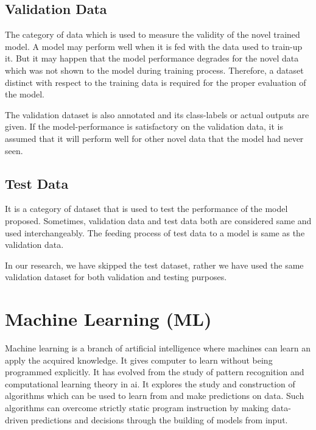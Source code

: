         \subsection{Validation Data}
            The category of data which is used to measure the validity of the novel trained model. A model may perform well when it is fed with the data used to train-up it. But it may happen that the model performance degrades for the novel data which was not shown to the model during training process\cite{mahadevan2005validation}. Therefore, a dataset distinct with respect to the training data is required for the proper evaluation of the model.
            
            The validation dataset is also annotated and its class-labels or actual outputs are given. If the model-performance is satisfactory on the validation data, it is assumed that it will perform well for other novel data that the model had never seen\cite{mahadevan2005validation}.
            
        \subsection{Test Data}
            It is a category of dataset that is used to test the performance of the model proposed. Sometimes, validation data and test data both are considered same and used interchangeably\cite{pargas1999test}. The feeding process of test data to a model is same as the validation data.
            
            In our research, we have skipped the test dataset, rather we have used the same validation dataset for both validation and testing purposes.
            
    \section{Machine Learning (ML)}
        Machine learning is a branch of artificial intelligence where machines can learn an apply the acquired knowledge. It gives computer to learn without being programmed explicitly\cite{kotsiantis2006machine}. It has evolved from the study of pattern recognition and computational learning theory in \acrfull{ai}. It explores the study and construction of algorithms which can be used to learn from and make predictions on data\cite{kotsiantis2006machine}. Such algorithms can overcome strictly static program instruction by making data-driven predictions and decisions through the building of models from input\cite{kotsiantis2006machine}.
        
